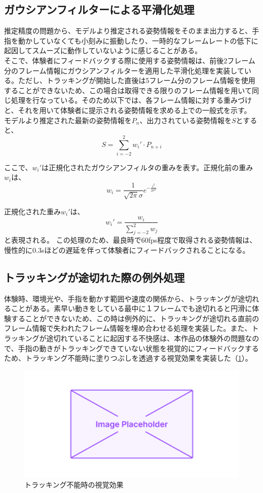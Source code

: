 \subsection{ガウシアンフィルターによる平滑化処理}
推定精度の問題から、モデルより推定される姿勢情報をそのまま出力すると、手指を動かしていなくても小刻みに振動したり、一時的なフレームレートの低下に起因してスムーズに動作していないように感じることがある。\\
そこで、体験者にフィードバックする際に使用する姿勢情報は、前後2フレーム分のフレーム情報にガウシアンフィルターを適用した平滑化処理を実装している。ただし、トラッキングが開始した直後は5フレーム分のフレーム情報を使用することができないため、この場合は取得できる限りのフレーム情報を用いて同じ処理を行なっている。そのため以下では、各フレーム情報に対する重みづけと、それを用いて体験者に提示される姿勢情報を求める上での一般式を示す。
モデルより推定された最新の姿勢情報を\(P_{n}\)、出力されている姿勢情報を\(S\)とすると、
  \begin{equation}
    S = \sum_{i=-2}^{2} w_i' \cdot P_{n+i}
    \end{equation}

ここで、\(w_i'\)は正規化されたガウシアンフィルタの重みを表す。正規化前の重み\(w_i\)は、
\begin{equation}
  w_i = \frac{1}{\sqrt{2\pi}\sigma} e^{-\frac{i^2}{2\sigma^2}}
  \end{equation}

正規化された重み\(w_i'\)は、
  \begin{equation}
  w_i' = \frac{w_i}{\sum_{j=-2}^{2} w_j}
  \end{equation}
と表現される。
この処理のため、最良時で60fps程度で取得される姿勢情報は、慢性的に0.3sほどの遅延を伴って体験者にフィードバックされることになる。

\subsection{トラッキングが途切れた際の例外処理}
体験時、環境光や、手指を動かす範囲や速度の関係から、トラッキングが途切れることがある。素早い動きをしている最中に１フレームでも途切れると円滑に体験することができないため、この時は例外的に、トラッキングが途切れる直前のフレーム情報で失われたフレーム情報を埋め合わせる処理を実装した。また、トラッキングが途切れていることに起因する不快感は、本作品の体験外の問題なので、手指の動きがトラッキングできていない状態を視覚的にフィードバックするため、トラッキング不能時に塗りつぶしを透過する視覚効果を実装した（\ref{fig:opacity}）。

\begin{figure}[H]
  \centering
  \includegraphics[width=15cm]{img/placeholder.png}
  \caption{トラッキング不能時の視覚効果}
  \label{fig:opacity}
\end{figure}